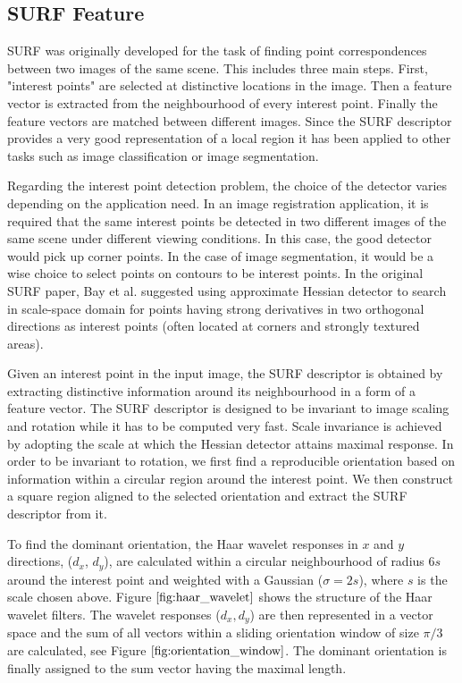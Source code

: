 \documentclass{SMBV12}
\begin{document}
\subsection{SURF Feature}
\label{sec:surf}
SURF \cite{bay2006surf} was originally developed for the task of finding point correspondences between two images of the same scene. This includes three main steps. First, "interest points" are
selected at distinctive locations in the image. Then a feature vector is extracted from the neighbourhood of every interest point. Finally the feature vectors are matched between different images. Since the SURF descriptor provides a very good representation of a local region it has been applied to other tasks such as image classification or image segmentation.

Regarding the interest point detection problem, the choice of the detector varies depending on the application need. In an image registration application, it is required that the same interest points be detected in two different images of the same scene under different viewing conditions. In this case, the good detector would pick up corner points. In the case of image segmentation, it would be a wise choice to select points on contours to be interest points. In the original SURF paper, Bay et al. suggested using approximate Hessian detector to search in scale-space domain for points having strong derivatives in two orthogonal directions as interest points (often located at corners and strongly textured areas).

Given an interest point in the input image, the SURF descriptor is obtained by extracting distinctive information around its neighbourhood in a form of a feature vector. The SURF descriptor is designed to be invariant to image scaling and rotation while it has to be computed very fast. Scale invariance is achieved by adopting the scale at which the Hessian detector attains maximal response. In order to be invariant to rotation, we first find a reproducible orientation based on information within a circular region around the interest point. We then construct a square region aligned to the selected orientation and extract the SURF descriptor from it.

To find the dominant orientation, the Haar wavelet responses in $x$ and $y$ directions, ($d_x$, $d_y$), are calculated within a circular neighbourhood of radius $6s$ around the interest point and weighted with a Gaussian ($\sigma = 2s$), where $s$ is the scale chosen above. Figure $\ref{fig:haar_wavelet}$ shows the structure of the Haar wavelet filters. The wavelet responses ($d_x, d_y$) are then represented in a vector space and the sum of all vectors within a sliding orientation window of size $\pi/3$ are calculated, see Figure $\ref{fig:orientation_window}$. The dominant orientation is finally assigned to the sum vector having the maximal length.
\end{document}
